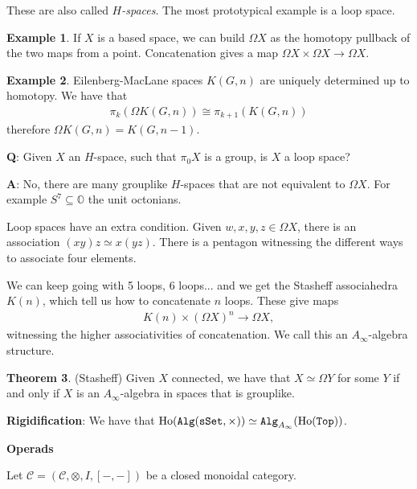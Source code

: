 \documentclass[12pt]{amsart}
\theoremstyle{definition}
\newtheorem{theorem}{Theorem}[section]
\newtheorem{example}[theorem]{Example}
\begin{document}
These are also called $H$\textit{-spaces}. The most prototypical example is a loop space.

\begin{example} If $X$ is a based space, we can build $\Omega X$ as the homotopy pullback of the two maps from a point. Concatenation gives a map $\Omega X \times \Omega X \to \Omega X$.
\end{example}

\begin{example} Eilenberg-MacLane spaces $K(G,n)$ are uniquely determined up to homotopy. We have that
\begin{align*}
    \pi_k \left( \Omega K(G,n) \right) \cong \pi_{k+1}(K(G,n))
\end{align*}
therefore $\Omega K(G,n) = K(G,n-1)$.
\end{example}

\textbf{Q}: Given $X$ an $H$-space, such that $\pi_0 X$ is a group, is $X$ a loop space?

\textbf{A}: No, there are many grouplike $H$-spaces that are not equivalent to $\Omega X$. For example $S^7 \subseteq \mathbb{O}$ the unit octonians.

Loop spaces have an extra condition. Given $w,x,y,z \in \Omega X$, there is an association $(xy)z \simeq x(yz)$. There is a pentagon witnessing the different ways to associate four elements.

We can keep going with 5 loops, 6 loops... and we get the Stasheff associahedra $K(n)$, which tell us how to concatenate $n$ loops. These give maps
\begin{align*}
    K(n) \times (\Omega X)^n \to \Omega X,
\end{align*}
witnessing the higher associativities of concatenation. We call this an $A_\infty$-algebra structure.

\begin{theorem} (Stasheff) Given $X$ connected, we have that $X \simeq \Omega Y$ for some $Y$ if and only if $X$ is an $A_\infty$-algebra in spaces that is grouplike.
\end{theorem}

\textbf{Rigidification}: We have that $\text{Ho}(\texttt{Alg}(\texttt{sSet},\times)) \simeq \texttt{Alg}_{A_\infty}(\text{Ho}(\texttt{Top}))$.

\begin{center}
    \textbf{Operads}
\end{center}

Let $\mathscr{C} = \left( \mathscr{C}, \otimes, I, [-,-] \right)$ be a closed monoidal category.
\end{document}
